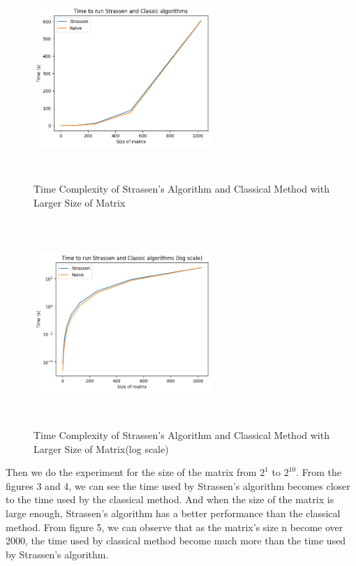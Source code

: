 \documentclass{article}
\begin{document}
\begin{figure}[h!]
    \centering
    \includegraphics[width=0.6\textwidth, height=7.8cm]{figs/time.png}
    \caption{Time Complexity of Strassen's Algorithm and Classical Method with Larger Size of Matrix}
\end{figure}
\begin{figure}[h!]
    \centering
    \includegraphics[width=0.6\textwidth, height=7.8cm]{figs/log_time.png}
    \caption{Time Complexity of Strassen's Algorithm and Classical Method with Larger Size of Matrix(log scale)}
\end{figure}

Then we do the experiment for the size of the matrix from $2^1$ to $2^{10}$. From the figures 3 and 4, we can see the time used by Strassen's algorithm becomes closer to the time used by the classical method. 
And when the size of the matrix is large enough, Strassen's algorithm has a better performance than the classical method. From figure 5, we can observe that as the matrix's size n become over 2000, the time used
by classical method become much more than the time used by Strassen's algorithm.\\
\end{document}
